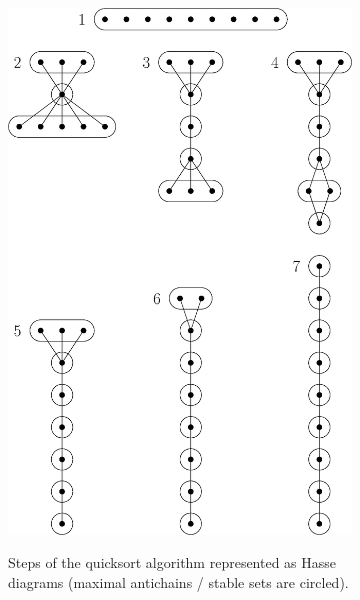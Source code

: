 \begin{figure} \centering \begin{subfigure}[b]{0.4\textwidth}
{\includegraphics[width=\textwidth]{fig/supi/quicksort}} \caption{Steps of the
quicksort algorithm represented as Hasse diagrams (maximal antichains / stable
sets are circled).} \label{fig:supi:quicksort} \end{subfigure}
\begin{subfigure}[b]{0.4\textwidth}

\end{subfigure}
\end{figure}
